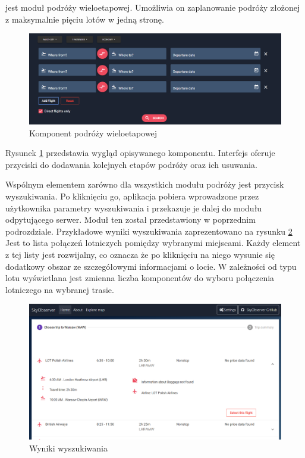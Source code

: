 \documentclass[12pt, twoside]{report}
\begin{document}
jest moduł podróży wieloetapowej. Umożliwia on zaplanowanie podróży złożonej z maksymalnie pięciu lotów w jedną stronę. 
\begin{figure}[!ht]
\centering
\includegraphics[scale=0.40, keepaspectratio]{multi_panel.png}
\caption{Komponent podróży wieloetapowej}
\label{fig:multi_panel}
\end{figure}
Rysunek \ref{fig:multi_panel} przedstawia wygląd opisywanego komponentu. Interfejs oferuje przyciski do dodawania kolejnych etapów podróży oraz ich usuwania.  

Wspólnym elementem zarówno dla wszystkich modułu podróży jest przycisk wyszukiwania. Po kliknięciu go, aplikacja pobiera wprowadzone przez użytkownika parametry wyszukiwania i przekazuje je dalej do modułu odpytującego serwer. Moduł ten został przedstawiony w poprzednim podrozdziale. Przykładowe wyniki wyszukiwania zaprezentowano na rysunku \ref{fig:result_component} Jest to lista połączeń lotniczych pomiędzy wybranymi miejscami. Każdy element z tej listy jest rozwijalny, co oznacza że po kliknięciu na niego wysunie się dodatkowy obszar ze szczegółowymi informacjami o locie. W zależności od typu lotu wyświetlana jest zmienna liczba komponentów do wyboru połączenia lotniczego na wybranej trasie.
\begin{figure}[!ht]
\centering
\includegraphics[scale=0.40, keepaspectratio]{result_component.png}
\caption{Wyniki wyszukiwania}
\label{fig:result_component}
\end{figure}
\end{document}
